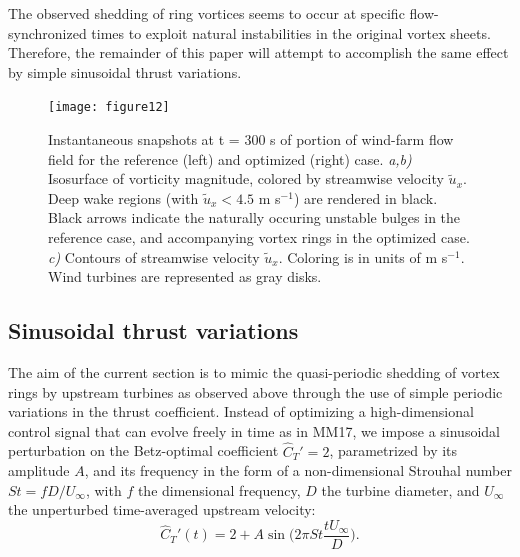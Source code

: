 \documentclass[wes, manuscript]{copernicus}
\begin{document}
The observed shedding of ring vortices seems to occur at specific flow-synchronized times to exploit natural instabilities in the original vortex sheets. Therefore, the remainder of this paper will attempt to accomplish the same effect by simple sinusoidal thrust variations. 

\begin{figure}
	\centering
	\texttt{[image: figure12]}
	\caption{Instantaneous snapshots at t = 300 s of portion of wind-farm flow field for the reference (left) and optimized (right) case. \emph{a,b) } Isosurface of vorticity magnitude, colored by streamwise velocity $\widetilde{u}_x$. Deep wake regions (with $\widetilde{u}_x < 4.5$ m s$^{-1}$) are rendered in black. Black arrows indicate the naturally occuring unstable bulges in the reference case, and accompanying vortex rings in the optimized case. \emph{c)} Contours of streamwise velocity $\widetilde{u}_x$. Coloring is in units of m s$^{-1}$. Wind turbines are represented as gray disks. \label{fig:vorticity_windfarm}}
\end{figure}


\subsection{Sinusoidal thrust variations}\label{sec:opt_sinus}
The aim of the current section is to mimic the quasi-periodic shedding of vortex rings by upstream turbines as observed above through the use of simple periodic variations in the thrust coefficient. Instead of optimizing a high-dimensional control signal that can evolve freely in time as in MM17, we impose a sinusoidal perturbation on the Betz-optimal coefficient $\widehat{C}_{T}' = 2$, parametrized by its amplitude $A$, and its frequency in the form of a non-dimensional Strouhal number $St = f D/ U_\infty$, with $f$ the dimensional frequency, $D$ the turbine diameter, and $U_\infty$ the unperturbed time-averaged upstream velocity:
\begin{equation}
\widehat{C}_{T}'(t) = 2 + A \sin \bigg(2\pi St \frac{t U_\infty}{D} \bigg).\label{eq:define_thrust}
\end{equation}
\end{document}
